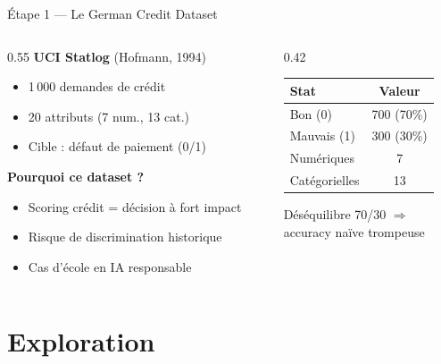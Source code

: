 \documentclass[aspectratio=169, 11pt]{beamer}
\begin{document}
\begin{frame}{\'Etape 1 --- Le German Credit Dataset}
\begin{columns}[T]
\begin{column}{0.55\textwidth}
\textbf{UCI Statlog} (Hofmann, 1994)
\begin{itemize}
    \item 1\,000 demandes de cr\'edit
    \item 20 attributs (7 num., 13 cat.)
    \item Cible : d\'efaut de paiement (0/1)
\end{itemize}

\vspace{0.5em}
\textbf{Pourquoi ce dataset ?}
\begin{itemize}
    \item Scoring cr\'edit = d\'ecision \`a fort impact
    \item Risque de discrimination historique
    \item Cas d'\'ecole en IA responsable
\end{itemize}
\end{column}
\begin{column}{0.42\textwidth}
\centering\small
\begin{tabular}{lc}
\toprule
\textbf{Stat} & \textbf{Valeur} \\
\midrule
Bon (0) & 700 (70\%) \\
Mauvais (1) & 300 (30\%) \\
\midrule
Num\'eriques & 7 \\
Cat\'egorielles & 13 \\
\bottomrule
\end{tabular}

\vspace{0.8em}
\begin{alertblock}{}
\small D\'es\'equilibre 70/30 $\Rightarrow$\\ accuracy na\"ive trompeuse
\end{alertblock}
\end{column}
\end{columns}
\end{frame}

\section{Exploration}
\end{document}
